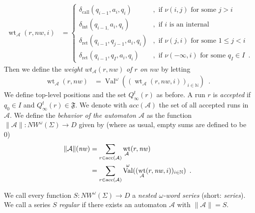 \documentclass[runningheads, envcountsame, a4paper]{llncs}
\DeclareMathOperator{\wt}{wt}
\DeclareMathOperator{\Val}{Val}
\DeclareMathOperator{\call}{call}
\DeclareMathOperator{\ret}{ret}
\begin{document}
\begin{align}
	 \wt_\mathcal{A}(r,\mathit{nw},i)&=\left \{ \begin{array}{ll}\delta_{\call}(q_{i-1},a_i,q_i) &, \text{ if } \nu(i,j) \text{ for some } j>i\\
					\delta_{\mathrm{int}}(q_{i-1,}a_i,q_i) &, \text{ if $i$ is an internal} \\
	\label{autgewichte}		\delta_{\ret}(q_{i-1},q_{j-1},a_i,q_i) &, \text{ if } \nu(j,i) \text{ for some } 1 \le j<i \\
					\delta_{\ret}(q_{i-1},q_{I},a_i,q_i) &, \text{ if } \nu(-\infty,i) \text{ for some } q_I \in I\enspace.
					\end{array} \right .
\end{align}
Then we define the \emph{weight} $\mathit{wt}_\mathcal{A}(r,\mathit{nw})$ \emph{of $r$ on $\mathit{nw}$} by letting
\begin{align*}
	\wt_\mathcal{A}(r,\mathit{nw})&=\Val^\omega((\wt_\mathcal{A}(r,\mathit{nw},i))_{i \in \mathbb{N} })\enspace. \end{align*}
We define top-level positions and the set $Q^t_\infty(r)$ as before. A run $r$ is \emph{accepted} if $q_0 \in I$ and $Q^t_\infty(r) \in \mathfrak{F}$. We denote with $\mathit{acc}(\mathcal{A})$ the set of all accepted runs in $\mathcal{A}$. We define the \emph{behavior of the automaton $\mathcal{A}$} as the function $\lVert \mathcal{A} \rVert: \mathit{NW^\omega}(\Sigma) \rightarrow D$ given by (where as usual, empty sums are defined to be $0$) 
\begin{align*}
\notag	\lVert \mathcal{A} \rVert(\mathit{nw})&=\sum_{r \in \acc(\mathcal{A})} \wt_\mathcal{A}(r,\mathit{nw})\\
	 	 &=\sum_{r \in \acc(\mathcal{A})}\Val^\omega((\wt_\mathcal{A}(r,\mathit{nw},i))_{i \in \mathbb{N} })\enspace.
\end{align*}
\par
	We call every function $S:\mathit{NW^\omega}(\Sigma) \rightarrow D$ a \emph{nested $\omega$-word series} (short: \emph{series}).
	We call a series $S$ \emph{regular} if there exists an automaton $\mathcal{A}$ with $\lVert \mathcal{A} \rVert=S$.
\end{document}
